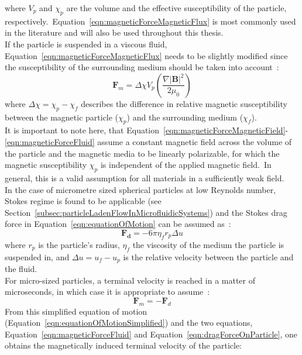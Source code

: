 where $V_{p}$ and $\chi_{p}$ are the volume and the effective susceptibility of the particle, respectively.\ Equation~\ref{eqn:magneticForceMagneticFlux} is most commonly used in the literature and will also be used throughout this thesis.\\
If the particle is suspended in a viscous fluid, Equation~\ref{eqn:magneticForceMagneticFlux} needs to be slightly modified since the susceptibility of the surrounding medium should be taken into account~\cite{Zborowski2011}:\
\begin{equation}
	\mathbf{F}_{m} = \Delta \chi V_{p} \left(\frac{\nabla |\mathbf{B}|^{2}}{2\mu_{0}}\right)
	\label{eqn:magneticForceFluid}
\end{equation}
where $\Delta \chi = \chi_{p}-\chi_{f}$ describes the difference in relative magnetic susceptibility between the magnetic particle ($\chi_{p}$) and the surrounding medium ($\chi_{f}$).\\
It is important to note here, that Equation~\ref{eqn:magneticForceMagneticField}-\ref{eqn:magneticForceFluid} assume a constant magnetic field across the volume of the particle and the magnetic media to be linearly polarizable, for which the magnetic susceptibility $\chi_{p}$ is independent of the applied magnetic field.\ In general, this is a valid assumption for all materials in a sufficiently weak field.\\
In the case of micrometre sized spherical particles at low Reynolds number, Stokes regime is found to be applicable (see Section~\ref{subsec:particleLadenFlowInMicrofluidicSystems}) and the Stokes drag force in Equation~\ref{eqn:equationOfMotion} can be assumed as~\cite{Happel2012}:\
\begin{equation}
	\mathbf{F_{d}} = -6\pi\eta_{f} r_{p} \Delta u
	\label{eqn:dragForceOnParticle}
\end{equation}
where $r_{p}$ is the particle's radius, $\eta_{f}$ the viscosity of the medium the particle is suspended in, and $\Delta u = u_{f}-u_{p}$ is the relative velocity between the particle and the fluid.\\
For micro-sized particles, a terminal velocity is reached in a matter of microseconds, in which case it is appropriate to assume~\cite{Abbasov1999}:
\begin{equation}
	\mathbf{F}_{m} = -\mathbf{F}_{d}
	\label{eqn:equationOfMotionSimplified}
\end{equation}
From this simplified equation of motion (Equation~\ref{eqn:equationOfMotionSimplified}) and the two equations, Equation~\ref{eqn:magneticForceFluid} and Equation~\ref{eqn:dragForceOnParticle}, one obtains the magnetically induced terminal velocity of the particle:\
